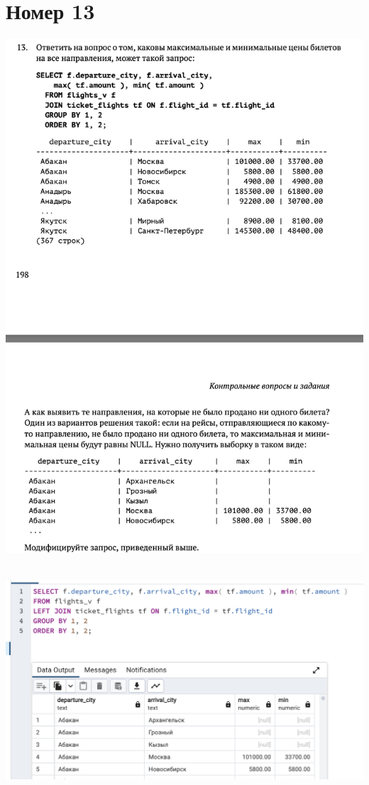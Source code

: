 \documentclass[a4paper,12pt]{article}
\begin{document}
\section*{Номер 13}
\includegraphics[scale=0.6]{t13.png}
\\\\
\begin{center}
\includegraphics[scale=0.5]{131.png}
\end{center}
\clearpage
\end{document}
